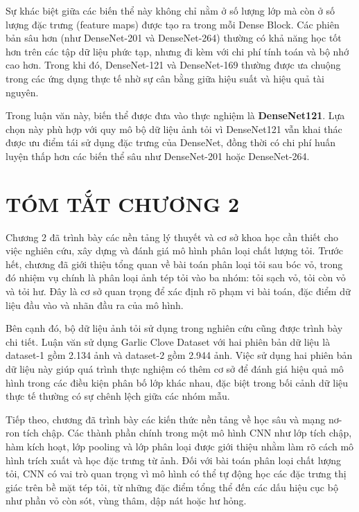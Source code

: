 \documentclass[
]{article}
\begin{document}
Sự khác biệt giữa các biến thể này không chỉ nằm ở số lượng lớp mà còn ở
số lượng đặc trưng (feature maps) được tạo ra trong mỗi Dense Block. Các
phiên bản sâu hơn (như DenseNet-201 và DenseNet-264) thường có khả năng
học tốt hơn trên các tập dữ liệu phức tạp, nhưng đi kèm với chi phí tính
toán và bộ nhớ cao hơn. Trong khi đó, DenseNet-121 và DenseNet-169
thường được ưa chuộng trong các ứng dụng thực tế nhờ sự cân bằng giữa
hiệu suất và hiệu quả tài nguyên.

Trong luận văn này, biến thể được đưa vào thực nghiệm là
\textbf{DenseNet121}. Lựa chọn này phù hợp với quy mô bộ dữ liệu ảnh
tỏi vì DenseNet121 vẫn khai thác được ưu điểm tái sử dụng đặc trưng của
DenseNet, đồng thời có chi phí huấn luyện thấp hơn các biến thể sâu như
DenseNet-201 hoặc DenseNet-264.

\section{TÓM TẮT CHƯƠNG 2}\label{tuxf3m-tux1eaft-chux1b0ux1a1ng-2}

Chương 2 đã trình bày các nền tảng lý thuyết và cơ sở khoa học cần thiết
cho việc nghiên cứu, xây dựng và đánh giá mô hình phân loại chất lượng
tỏi. Trước hết, chương đã giới thiệu tổng quan về bài toán phân loại tỏi
sau bóc vỏ, trong đó nhiệm vụ chính là phân loại ảnh tép tỏi vào ba
nhóm: tỏi sạch vỏ, tỏi còn vỏ và tỏi hư. Đây là cơ sở quan trọng để xác
định rõ phạm vi bài toán, đặc điểm dữ liệu đầu vào và nhãn đầu ra của mô
hình.

Bên cạnh đó, bộ dữ liệu ảnh tỏi sử dụng trong nghiên cứu cũng được trình
bày chi tiết. Luận văn sử dụng Garlic Clove Dataset với hai phiên bản dữ
liệu là dataset-1 gồm 2.134 ảnh và dataset-2 gồm 2.944 ảnh. Việc sử dụng
hai phiên bản dữ liệu này giúp quá trình thực nghiệm có thêm cơ sở để
đánh giá hiệu quả mô hình trong các điều kiện phân bố lớp khác nhau, đặc
biệt trong bối cảnh dữ liệu thực tế thường có sự chênh lệch giữa các
nhóm mẫu.

Tiếp theo, chương đã trình bày các kiến thức nền tảng về học sâu và mạng
nơ-ron tích chập. Các thành phần chính trong một mô hình CNN như lớp
tích chập, hàm kích hoạt, lớp pooling và lớp phân loại được giới thiệu
nhằm làm rõ cách mô hình trích xuất và học đặc trưng từ ảnh. Đối với bài
toán phân loại chất lượng tỏi, CNN có vai trò quan trọng vì mô hình có
thể tự động học các đặc trưng thị giác trên bề mặt tép tỏi, từ những đặc
điểm tổng thể đến các dấu hiệu cục bộ như phần vỏ còn sót, vùng thâm,
dập nát hoặc hư hỏng.
\end{document}
